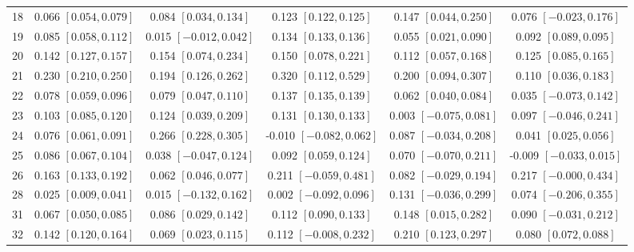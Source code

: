 \begin{landscape}
\begin{longtable}{lccccc}
18 & 0.066 {\scriptsize$[0.054,0.079]$} & 0.084 {\scriptsize$[0.034,0.134]$} & 0.123 {\scriptsize$[0.122,0.125]$} & 0.147 {\scriptsize$[0.044,0.250]$} & 0.076 {\scriptsize$[-0.023,0.176]$} \\
19 & 0.085 {\scriptsize$[0.058,0.112]$} & 0.015 {\scriptsize$[-0.012,0.042]$} & 0.134 {\scriptsize$[0.133,0.136]$} & 0.055 {\scriptsize$[0.021,0.090]$} & 0.092 {\scriptsize$[0.089,0.095]$} \\
20 & 0.142 {\scriptsize$[0.127,0.157]$} & 0.154 {\scriptsize$[0.074,0.234]$} & 0.150 {\scriptsize$[0.078,0.221]$} & 0.112 {\scriptsize$[0.057,0.168]$} & 0.125 {\scriptsize$[0.085,0.165]$} \\
21 & 0.230 {\scriptsize$[0.210,0.250]$} & 0.194 {\scriptsize$[0.126,0.262]$} & 0.320 {\scriptsize$[0.112,0.529]$} & 0.200 {\scriptsize$[0.094,0.307]$} & 0.110 {\scriptsize$[0.036,0.183]$} \\
22 & 0.078 {\scriptsize$[0.059,0.096]$} & 0.079 {\scriptsize$[0.047,0.110]$} & 0.137 {\scriptsize$[0.135,0.139]$} & 0.062 {\scriptsize$[0.040,0.084]$} & 0.035 {\scriptsize$[-0.073,0.142]$} \\
23 & 0.103 {\scriptsize$[0.085,0.120]$} & 0.124 {\scriptsize$[0.039,0.209]$} & 0.131 {\scriptsize$[0.130,0.133]$} & 0.003 {\scriptsize$[-0.075,0.081]$} & 0.097 {\scriptsize$[-0.046,0.241]$} \\
24 & 0.076 {\scriptsize$[0.061,0.091]$} & 0.266 {\scriptsize$[0.228,0.305]$} & -0.010 {\scriptsize$[-0.082,0.062]$} & 0.087 {\scriptsize$[-0.034,0.208]$} & 0.041 {\scriptsize$[0.025,0.056]$} \\
25 & 0.086 {\scriptsize$[0.067,0.104]$} & 0.038 {\scriptsize$[-0.047,0.124]$} & 0.092 {\scriptsize$[0.059,0.124]$} & 0.070 {\scriptsize$[-0.070,0.211]$} & -0.009 {\scriptsize$[-0.033,0.015]$} \\
26 & 0.163 {\scriptsize$[0.133,0.192]$} & 0.062 {\scriptsize$[0.046,0.077]$} & 0.211 {\scriptsize$[-0.059,0.481]$} & 0.082 {\scriptsize$[-0.029,0.194]$} & 0.217 {\scriptsize$[-0.000,0.434]$} \\
28 & 0.025 {\scriptsize$[0.009,0.041]$} & 0.015 {\scriptsize$[-0.132,0.162]$} & 0.002 {\scriptsize$[-0.092,0.096]$} & 0.131 {\scriptsize$[-0.036,0.299]$} & 0.074 {\scriptsize$[-0.206,0.355]$} \\
31 & 0.067 {\scriptsize$[0.050,0.085]$} & 0.086 {\scriptsize$[0.029,0.142]$} & 0.112 {\scriptsize$[0.090,0.133]$} & 0.148 {\scriptsize$[0.015,0.282]$} & 0.090 {\scriptsize$[-0.031,0.212]$} \\
32 & 0.142 {\scriptsize$[0.120,0.164]$} & 0.069 {\scriptsize$[0.023,0.115]$} & 0.112 {\scriptsize$[-0.008,0.232]$} & 0.210 {\scriptsize$[0.123,0.297]$} & 0.080 {\scriptsize$[0.072,0.088]$} \\

\end{longtable}
\end{landscape}
